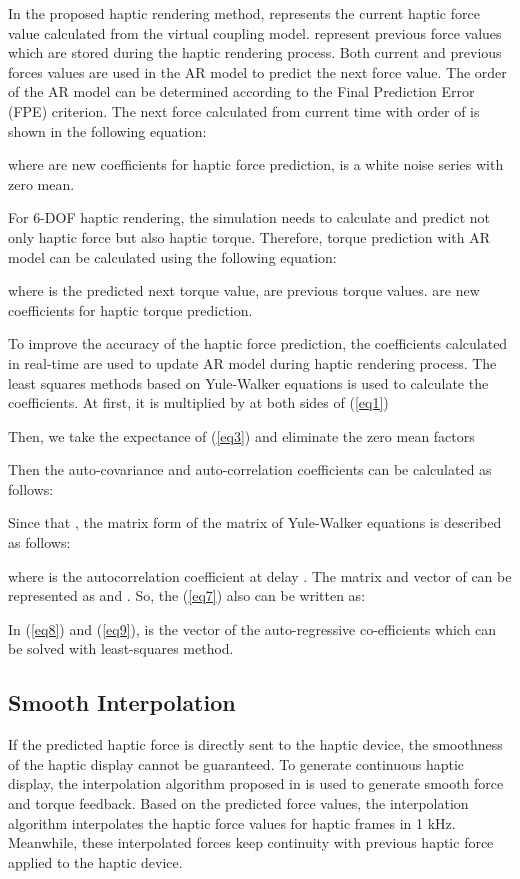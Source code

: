 \documentclass[10pt,journal,cspaper,compsoc]{IEEEtran}
\begin{document}
In the proposed haptic rendering method,  represents the current haptic force value calculated from the virtual coupling model.  represent previous force values which are stored during the haptic rendering process. Both current and previous forces values are used in the AR model to predict the next force value. The order  of the AR model can be determined according to the Final Prediction Error (FPE) criterion. The next force   calculated from current time  with order of  is shown in the following equation:




where  are new coefficients for haptic force prediction,  is a white noise series with zero mean. 

For 6-DOF haptic rendering, the simulation needs to calculate and predict not only haptic force but also haptic torque. Therefore, torque prediction with AR model can be calculated using the following equation:

where   is the predicted next torque value,  are previous torque values.  are new coefficients for haptic torque prediction. 

To improve the accuracy of the haptic force prediction, the coefficients calculated in real-time are used to update AR model during haptic rendering process. The least squares methods based on Yule-Walker equations is used to calculate the coefficients. At first, it is multiplied by  at both sides of (\ref{eq1})

Then, we take the expectance of (\ref{eq3}) and eliminate the zero mean factors

Then the auto-covariance  and  auto-correlation   coefficients can be calculated as follows:


Since that , the matrix form of the matrix of Yule-Walker equations \cite{no21} is described as follows:

where  is the autocorrelation coefficient at delay . The matrix and vector of  can be represented as  and . So, the (\ref{eq7}) also can be written as:


In (\ref{eq8}) and (\ref{eq9}),  is the vector of the auto-regressive co-efficients which can be solved with least-squares method.

\subsection{Smooth Interpolation }
\label{sec:3.2}
If the predicted haptic force is directly sent to the haptic device, the smoothness of the haptic display cannot be guaranteed. To generate continuous haptic display, the interpolation algorithm proposed in \cite{no20} is used to generate smooth force and torque feedback. Based on the predicted force values, the interpolation algorithm interpolates the haptic force values for haptic frames in 1 kHz. Meanwhile, these interpolated forces keep continuity with previous haptic force applied to the haptic device. 
\end{document}
